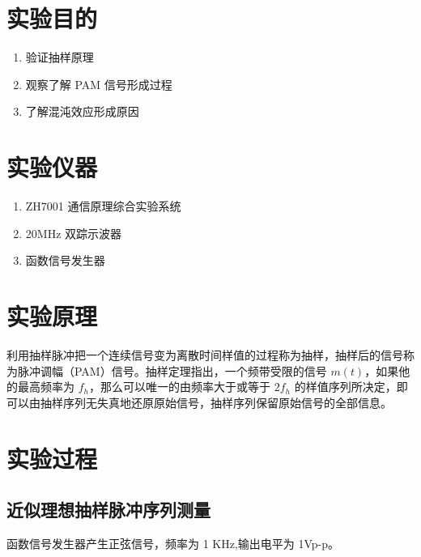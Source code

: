 \documentclass[UTF8,AutoFakeBold,AutoFakeSlant,12pt]{ctexart}
\newcommand{\reportName}{多体制数字移动通信技术实验报告}
\begin{document}


\pagestyle{fancy}
\setcounter{page}{1}
\fancyhf{}
\fancyhead[R]{\fontsize{10.5pt}{10.5pt}\selectfont{\reportName}}
\fancyfoot[R]{\fontsize{9pt}{9pt}\selectfont{\thepage}}
\renewcommand{\headrulewidth}{1pt}
\renewcommand{\footrulewidth}{0pt}

\setlength{\parindent}{1.02cm}



\section{实验目的}
\begin{enumerate}
  \item 验证抽样原理
  \item 观察了解 PAM 信号形成过程
  \item 了解混沌效应形成原因
\end{enumerate}

\section{实验仪器}
\begin{enumerate}
  \item ZH7001 通信原理综合实验系统
  \item 20MHz 双踪示波器
  \item 函数信号发生器
\end{enumerate}

\section{实验原理}
利用抽样脉冲把一个连续信号变为离散时间样值的过程称为抽样，抽样后的信号称为脉冲调幅（PAM）信号。抽样定理指出，一个频带受限的信号 $m(t)$，如果他的最高频率为 $f_h$，那么可以唯一的由频率大于或等于 $2f_h$ 的样值序列所决定，即可以由抽样序列无失真地还原原始信号，抽样序列保留原始信号的全部信息。

\section{实验过程}
\subsection{近似理想抽样脉冲序列测量}
函数信号发生器产生正弦信号，频率为 1 KHz,输出电平为 1Vp-p。
\end{document}
